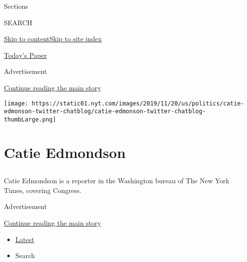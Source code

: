 Sections

SEARCH

\protect\hyperlink{site-content}{Skip to
content}\protect\hyperlink{site-index}{Skip to site index}

\href{https://myaccount.nytimes.com/auth/login?response_type=cookie\&client_id=vi}{}

\href{https://www.nytimes.com/section/todayspaper}{Today's Paper}

Advertisement

\protect\hyperlink{after-top}{Continue reading the main story}

\texttt{[image: https://static01.nyt.com/images/2019/11/20/us/politics/catie-edmonson-twitter-chatblog/catie-edmonson-twitter-chatblog-thumbLarge.png]}

\hypertarget{catie-edmondson}{%
\section{Catie Edmondson}\label{catie-edmondson}}

\subsection{}

Catie Edmondson is a reporter in the Washington bureau of The New York
Times, covering Congress.

Advertisement

\protect\hyperlink{after-mid1}{Continue reading the main story}

\begin{itemize}
\tightlist
\item
  \protect\hyperlink{stream-panel}{Latest}
\item
  Search
\end{itemize}

